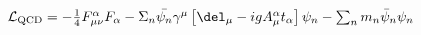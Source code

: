 \documentclass[preview]{standalone}
\begin{document}
\begin{center}
$\mathcal{L}_\text{QCD} = -{\textstyle{\frac{1}{4}}}F^\alpha_{\mu\nu}F_\alpha - \Sigma_n \bar{\psi_n} \gamma^\mu \left[ \del_\mu - igA^\alpha_\mu t_\alpha\right]\psi_n - \sum_n m_n \bar{\psi}_n\psi_n$
\end{center}
\end{document}
